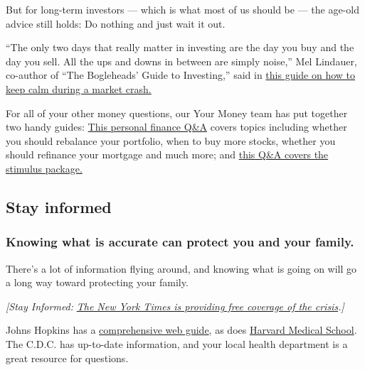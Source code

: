 But for long-term investors --- which is what most of us should be ---
the age-old advice still holds: Do nothing and just wait it out.

``The only two days that really matter in investing are the day you buy
and the day you sell. All the ups and downs in between are simply
noise,'' Mel Lindauer, co-author of ``The Bogleheads' Guide to
Investing,'' said in
\href{https://www.nytimes3xbfgragh.onion/2020/03/15/smarter-living/corona-stock-market-tips-dealing-with-financial-crash-crisis.html}{this
guide on how to keep calm during a market crash.}

For all of your other money questions, our Your Money team has put
together two handy guides:
\href{https://www.nytimes3xbfgragh.onion/article/coronavirus-money-advice.html}{This
personal finance Q\&A} covers topics including whether you should
rebalance your portfolio, when to buy more stocks, whether you should
refinance your mortgage and much more; and
\href{https://www.nytimes3xbfgragh.onion/article/coronavirus-stimulus-package-questions-answers.html}{this
Q\&A covers the stimulus package.}

\hypertarget{stay-informed}{%
\subsection{Stay informed}\label{stay-informed}}

\hypertarget{knowing-what-is-accurate-can-protect-you-and-your-family}{%
\subsubsection{Knowing what is accurate can protect you and your
family.}\label{knowing-what-is-accurate-can-protect-you-and-your-family}}

There's a lot of information flying around, and knowing what is going on
will go a long way toward protecting your family.

\emph{{[}Stay Informed:}
\href{https://www.nytimes3xbfgragh.onion/news-event/coronavirus?action=click\&module=Spotlight\&pgtype=Homepage}{\emph{The
New York Times is providing free coverage of the crisis}}\emph{.{]}}

Johns Hopkins has a \href{https://coronavirus.jhu.edu/}{comprehensive
web guide}, as does
\href{https://www.health.harvard.edu/diseases-and-conditions/coronavirus-resource-center}{Harvard
Medical School}. The C.D.C. has up-to-date information, and your local
health department is a great resource for questions.

